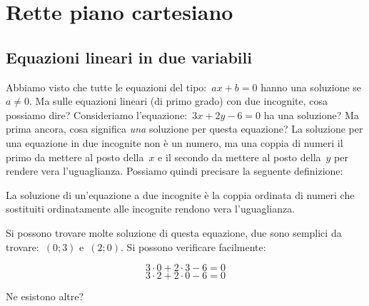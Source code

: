 
\chapter{Rette piano cartesiano}

\section{Equazioni lineari in due variabili}
\label{sec:retta_equazionilineari}

Abbiamo visto che tutte le equazioni del tipo:~$ax+b=0$ hanno una soluzione
se $a\neq0$. Ma sulle equazioni lineari (di primo grado) con due incognite, 
cosa possiamo dire? Consideriamo l'equazione:~$3x + 2y - 6 = 0$ 
ha una soluzione? Ma prima ancora, cosa significa \emph{una} soluzione per 
questa equazione? La soluzione per una equazione in due incognite  non è un 
numero, ma una coppia di numeri il primo da mettere al posto della~$x$ e il
secondo da mettere al posto della~$y$ per rendere vera l'uguaglianza.
Possiamo quindi precisare la seguente definizione:

\begin{definizione}
 La soluzione di un'equazione a due incognite è la coppia ordinata di numeri 
 che sostituiti ordinatamente alle incognite rendono vera l'uguaglianza.
\end{definizione}

Si possono trovare molte soluzione di questa equazione, due sono 
semplici da trovare:~$(0; 3)$ e~$(2; 0)$. Si possono verificare facilmente:

\[3 \cdot 0 + 2 \cdot 3 - 6 = 0\]
\[3 \cdot 2 + 2 \cdot 0 - 6 = 0\]

Ne esistono altre?

